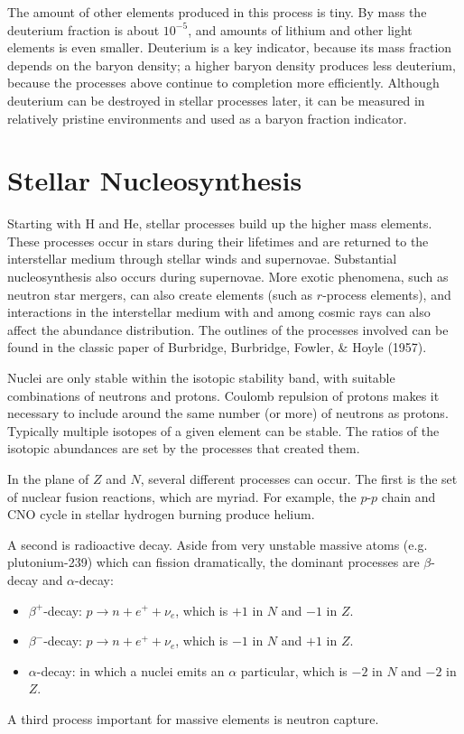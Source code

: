 The amount of other elements produced in this process is tiny. By mass
the deuterium fraction is about $10^{-5}$, and amounts of lithium and
other light elements is even smaller. Deuterium is a key indicator,
because its mass fraction depends on the baryon density; a higher
baryon density produces less deuterium, because the processes above
continue to completion more efficiently. Although deuterium can be
destroyed in stellar processes later, it can be measured in relatively
pristine environments and used as a baryon fraction indicator.

\section{Stellar Nucleosynthesis}

Starting with H and He, stellar processes build up the higher mass
elements. These processes occur in stars during their lifetimes and
are returned to the interstellar medium through stellar winds and
supernovae. Substantial nucleosynthesis also occurs during
supernovae. More exotic phenomena, such as neutron star mergers, can
also create elements (such as $r$-process elements), and interactions
in the interstellar medium with and among cosmic rays can also affect
the abundance distribution. The outlines of the processes involved can
be found in the classic paper of Burbridge, Burbridge, Fowler, \&
Hoyle (1957).

Nuclei are only stable within the isotopic stability band, with
suitable combinations of neutrons and protons.  Coulomb repulsion of
protons makes it necessary to include around the same number (or more)
of neutrons as protons. Typically multiple isotopes of a given element
can be stable. The ratios of the isotopic abundances are set by the
processes that created them.

In the plane of $Z$ and $N$, several different processes can occur.
The first is the set of nuclear fusion reactions, which are
myriad. For example, the $p$-$p$ chain and CNO cycle in stellar
hydrogen burning produce helium.

A second is radioactive decay. Aside from very unstable massive atoms
(e.g. plutonium-239) which can fission dramatically, the dominant
processes are $\beta$-decay and $\alpha$-decay:
\begin{itemize}
\item $\beta^{+}$-decay: $p \rightarrow n + e^+ + \nu_e$, which is
  $+1$ in $N$ and $-1$ in $Z$.
\item $\beta^{-}$-decay: $p \rightarrow n + e^+ + \nu_e$, which is
  $-1$ in $N$ and $+1$ in $Z$.
\item $\alpha$-decay: in which a nuclei emits an $\alpha$ particular,
  which is $-2$ in $N$ and $-2$ in $Z$.
\end{itemize}
A third process important for massive elements is neutron capture.

